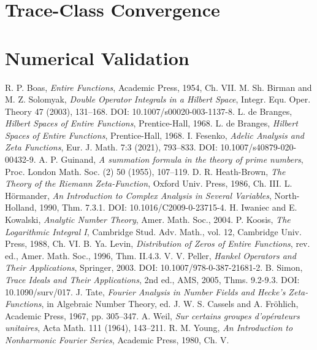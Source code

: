 \documentclass[12pt]{article}
\begin{document}
\appendix

\section{Trace-Class Convergence}


\section{Numerical Validation}


\begin{thebibliography}{20}
 R. P. Boas, \emph{Entire Functions}, Academic Press, 1954, Ch. VII.
 M. Sh. Birman and M. Z. Solomyak, \emph{Double Operator Integrals in a Hilbert Space}, Integr. Equ. Oper. Theory 47 (2003), 131–168. DOI: 10.1007/s00020-003-1137-8.
 L. de Branges, \emph{Hilbert Spaces of Entire Functions}, Prentice-Hall, 1968.
 L. de Branges, \emph{Hilbert Spaces of Entire Functions}, Prentice-Hall, 1968.
 I. Fesenko, \emph{Adelic Analysis and Zeta Functions}, Eur. J. Math. 7:3 (2021), 793–833. DOI: 10.1007/s40879-020-00432-9.
 A. P. Guinand, \emph{A summation formula in the theory of prime numbers}, Proc. London Math. Soc. (2) 50 (1955), 107–119.
 D. R. Heath-Brown, \emph{The Theory of the Riemann Zeta-Function}, Oxford Univ. Press, 1986, Ch. III.
 L. Hörmander, \emph{An Introduction to Complex Analysis in Several Variables}, North-Holland, 1990, Thm. 7.3.1. DOI: 10.1016/C2009-0-23715-4.
 H. Iwaniec and E. Kowalski, \emph{Analytic Number Theory}, Amer. Math. Soc., 2004.
 P. Koosis, \emph{The Logarithmic Integral I}, Cambridge Stud. Adv. Math., vol. 12, Cambridge Univ. Press, 1988, Ch. VI.
 B. Ya. Levin, \emph{Distribution of Zeros of Entire Functions}, rev. ed., Amer. Math. Soc., 1996, Thm. II.4.3.
 V. V. Peller, \emph{Hankel Operators and Their Applications}, Springer, 2003. DOI: 10.1007/978-0-387-21681-2.
 B. Simon, \emph{Trace Ideals and Their Applications}, 2nd ed., AMS, 2005, Thms. 9.2-9.3. DOI: 10.1090/surv/017.
 J. Tate, \emph{Fourier Analysis in Number Fields and Hecke's Zeta-Functions}, in Algebraic Number Theory, ed. J. W. S. Cassels and A. Fröhlich, Academic Press, 1967, pp. 305–347.
 A. Weil, \emph{Sur certains groupes d'opérateurs unitaires}, Acta Math. 111 (1964), 143–211.
 R. M. Young, \emph{An Introduction to Nonharmonic Fourier Series}, Academic Press, 1980, Ch. V.
\end{thebibliography}
\end{document}
